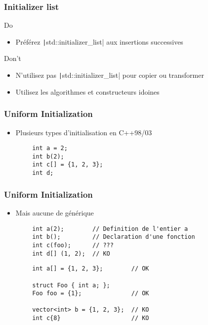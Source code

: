 \documentclass[C++.tex]{subfiles}
\begin{document}
\begin{frame}[fragile]
\frametitle{Initializer list}
	\begin{exampleblock}{Do}
		\begin{itemize}
			\item Préférez \texttt|std::initializer_list| aux insertions successives
		\end{itemize}
	\end{exampleblock}

	\begin{alertblock}{Don't}
		\begin{itemize}
			\item N'utilisez pas \texttt|std::initializer_list| pour copier ou transformer
			\item Utilisez les algorithmes et constructeurs idoines
		\end{itemize}

	\end{alertblock}
\end{frame}

\begin{frame}[fragile]
	\frametitle{Uniform Initialization}
	\begin{itemize}
		\item Plusieurs types d'initialisation en C++98/03
	\end{itemize}

	\begin{verbatim}
		int a = 2;
		int b(2);
		int c[] = {1, 2, 3};
		int d;
	\end{verbatim}
\end{frame}

\begin{frame}[fragile]
	\frametitle{Uniform Initialization}
	\begin{itemize}
		\item Mais aucune de générique
	\end{itemize}

	\begin{verbatim}
		int a(2);        // Definition de l'entier a
		int b();         // Declaration d'une fonction
		int c(foo);      // ???
		int d[] (1, 2);  // KO
	\end{verbatim}


	\begin{verbatim}
		int a[] = {1, 2, 3};        // OK

		struct Foo { int a; };
		Foo foo = {1};              // OK

		vector<int> b = {1, 2, 3};  // KO
		int c{8}                    // KO
	\end{verbatim}

\end{frame}
\end{document}

